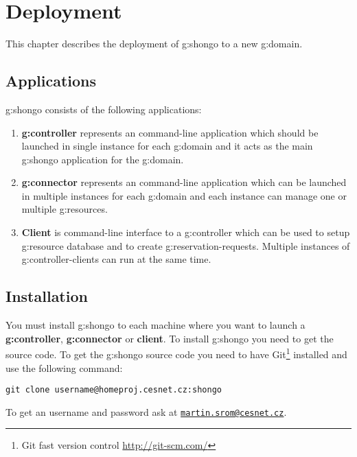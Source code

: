 \chapter{Deployment}

This chapter describes the deployment of \gls{g:shongo} to a new \gls{g:domain}.

\section{Applications}

\Gls{g:shongo} consists of the following applications:
\begin{enumerate}
\item \textbf{\Gls{g:controller}} represents an command-line application which should be launched in single instance for each \gls{g:domain} and it acts as the main \gls{g:shongo} application for the \gls{g:domain}.
\item \textbf{\Gls{g:connector}} represents an command-line application which can be launched in multiple instances for each \gls{g:domain} and each instance can manage one or multiple \glspl{g:resource}.
\item \textbf{Client} is command-line interface to a \gls{g:controller} which can be used to setup \gls{g:resource} database and to create \glspl{g:reservation-request}. Multiple instances of \glspl{g:controller-client} can run at the same time.
\end{enumerate}

\section{Installation}

You must install \gls{g:shongo} to each machine where you want to launch a \textbf{\gls{g:controller}}, \textbf{\gls{g:connector}} or \textbf{client}. To install \gls{g:shongo} you need to get the source code. To get the \gls{g:shongo} source code you need to have Git\footnote{Git fast version control \url{http://git-scm.com/}} installed and use the following command:
\begin{verbatim}
git clone username@homeproj.cesnet.cz:shongo
\end{verbatim}
To get an username and password ask at \href{mailto:martin.srom@cesnet.cz}{\texttt{martin.srom@cesnet.cz}}. 

